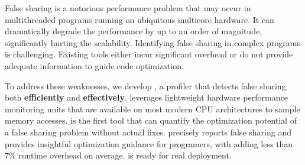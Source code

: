 
False sharing is a notorious performance problem that may occur in multithreaded programs running on ubiquitous multicore hardware. It can dramatically degrade the performance by up to an order of magnitude, significantly hurting the scalability. Identifying false sharing in complex programs is challenging. Existing tools either incur significant overhead or do not provide adequate information to guide code optimization.

\sloppy
To address these weaknesses, we develop \cheetah{}, a profiler that detects false sharing both {\bf efficiently} and {\bf effectively}. \cheetah{} leverages lightweight hardware performance monitoring units that are available on most modern CPU architectures to sample memory accesses. \cheetah{} is the first tool that can quantify the optimization potential of a false sharing problem without actual fixes. \cheetah{} precisely reports false sharing and provides insightful optimization guidance for programers, with adding less than $7\%$ runtime overhead on average. \Cheetah{} is ready for real deployment. 



